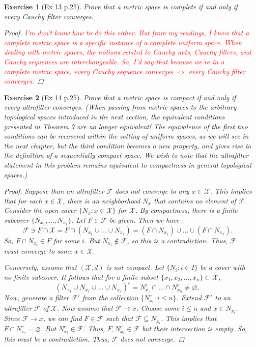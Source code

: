 \documentclass[11pt]{article}
\newtheorem{exercise}{Exercise}
\newcommand{\F}{\mathcal{F}}
\newcommand{\X}{\mathcal{X}}
\newcommand{\lp}{\left(}
\newcommand{\rp}{\right)}
\begin{document}
\begin{exercise}[Ex 13 p.25]
	Prove that a metric space is complete if and only if every Cauchy filter converges.
	\begin{proof}
		\textcolor{red}{I'm don't know how to do this either. But from my readings, I know that a complete metric space is a specific instance of a complete uniform space. When dealing with metric spaces, the notions related to Cauchy nets, Cauchy filters, and Cauchy sequences are interchangeable. So, I'd say that because we're in a complete metric space, every Cauchy sequence converges $\iff$ every Cauchy filter converges.} 
	\end{proof}
\end{exercise}

\begin{exercise}[Ex 14 p.25]
	Prove that a metric space is compact if and only if every ultrafilter converges.
	(When passing from metric spaces to the arbitrary topological spaces introduced in the next section, the equivalent conditions presented in Theorem 7 are no longer equivalent! The equivalence of the first two conditions can be recovered within the setting of uniform spaces, as we will see in the next chapter, but the third condition becomes a new property, and gives rise to the definition of a \textit{sequentially compact} space. We wish to note that the ultrafilter statement in this problem remains equivalent to compactness in general topological spaces.)
	\begin{proof}
		Suppose than an ultrafilter $\F$ does not converge to any $x\in \X$. This implies that for each $x\in \X$, there is an neighborhood $N_x$ that contains no element of $\F$. Consider the open cover $\{ N_x : x\in \X \}$ for $\X$. By compactness, there is a finite subcover $\{ N_{x_1},\dots, N_{x_k} \}$. Let $F\in \F$ be given. Then we have
		\begin{equation*}
		\F \ni F\cap \X = F \cap \lp N_{x_1} \cup \dots \cup N_{x_k} \rp = (F \cap N_{x_1}) \cup \dots \cup (F\cap N_{x_k}) .
		\end{equation*}
		So, $F\cap N_{x_i} \in F$ for some $i$. But $N_{x_i} \not\in \F$, so this is a contradiction. Thus, $\F$ must converge to some $x\in \X$.
		
		Conversely, assume that $(\X,d)$ is not compact. Let $\{N_i : i\in I \}$ be a cover with no finite subcover. It follows that for a finite subset $\{ x_1,x_2,\dots, x_n\} \subset \X$, 
		\begin{equation*}
		(N_{x_1} \cup N_{x_2} \cup \dots \cup N_{x_n})^c = N_{x_1}^c \cap \dots \cap N_{x_n}^c \neq \varnothing,
		\end{equation*} 
		Now, generate a filter $\F'$ from the collection $\{ N_{x_i}^c : i \leq n \}$. Extend $\F'$ to an ultrafilter $\F$ of $\X$. Now assume that $\F \to x$. Choose some $i\leq n$ and $x\in N_{x_i}$. Since $\F \to x$, we can find $F \in \F$ such that $\F \subseteq N_{x_i}$. This implies that $F \cap N_{x_i}^c = \varnothing$. But $N_{x_i}^c \in \F$. Thus, $F, N_{x_i}^c \in \F$ but their intersection is empty. So, this must be a contradiction. Thus, $\F$ does not converge. 
	\end{proof}
\end{exercise}
\end{document}
